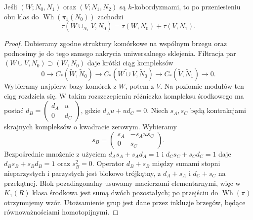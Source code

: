 \begin{lemat}
\label{lem:add-torsja-20}
Jeśli $(W;N_0,N_1)$ oraz $(V;N_1,N_2)$ są
$h$-kobordyzmami, to po przeniesieniu obu klas
do $\operatorname{Wh}(\pi_1(N_0))$ zachodzi
\[
 \tau(W\cup_{N_1}V,N_0)
 =\tau(W,N_0)+\tau(V,N_1).
\]
\end{lemat}
\begin{proof}
Dobieramy zgodne struktury komórkowe na wspólnym
brzegu oraz podnosimy je do tego samego nakrycia
uniwersalnego sklejenia. Filtracja par
$(W\cup V,N_0)\supset(W,N_0)$ daje krótki ciąg
kompleksów
\[
 0\to C_*(\widetilde W,\widetilde N_0)
 \to C_*(\widetilde{W\cup V},\widetilde N_0)
 \to C_*(\widetilde V,\widetilde N_1)\to0.
\]
Wybieramy najpierw bazy komórek z $W$, potem
z $V$. Na poziomie modułów ten ciąg rozdziela się.
W takim rozszczepieniu różniczka kompleksu
środkowego ma postać
$d_B=\left(\begin{smallmatrix}d_A&u\\0&d_C\end{smallmatrix}\right)$,
gdzie $d_Au+ud_C=0$. Niech $s_A,s_C$ będą
kontrakcjami skrajnych kompleksów o kwadracie
zerowym. Wybieramy
\[
 s_B=\begin{pmatrix}
 s_A&-s_Au s_C\\0&s_C
 \end{pmatrix}.
\]
Bezpośrednie mnożenie z użyciem
$d_As_A+s_Ad_A=1$ i $d_Cs_C+s_Cd_C=1$
daje $d_Bs_B+s_Bd_B=1$ oraz $s_B^2=0$.
Operator $d_B+s_B$ między sumami stopni
nieparzystych i parzystych jest blokowo
trójkątny, z $d_A+s_A$ i $d_C+s_C$ na przekątnej.
Blok pozadiagonalny usuwamy macierzami
elementarnymi, więc w
$K_1(R)$ klasa środkowa jest sumą dwóch
pozostałych; po przejściu do $\operatorname{Wh}(\pi)$
otrzymujemy wzór. Utożsamienie grup jest dane
przez inkluzje brzegów, będące równoważnościami
homotopijnymi.
\end{proof}

